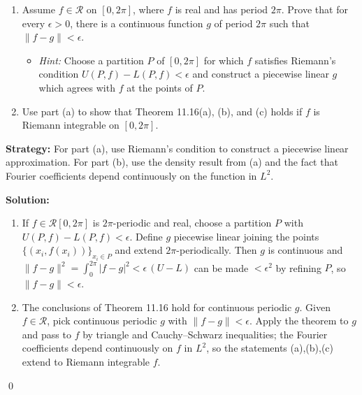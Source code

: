 \begin{problembox}
\begin{enumerate}[label=(\alph*)]
\item Assume $f \in \mathcal{R}$ on $[0, 2\pi]$, where $f$ is real and has period $2\pi$. Prove that for every $\epsilon > 0$, there is a continuous function $g$ of period $2\pi$ such that $\|f - g\| < \epsilon$.
\begin{itemize}
\item \textit{Hint:} Choose a partition $P$ of $[0, 2\pi]$ for which $f$ satisfies Riemann's condition $U(P, f) - L(P, f) < \epsilon$ and construct a piecewise linear $g$ which agrees with $f$ at the points of $P$.
\end{itemize}
\item Use part (a) to show that Theorem 11.16(a), (b), and (c) holds if $f$ is Riemann integrable on $[0, 2\pi]$.
\end{enumerate}
\end{problembox}

\noindent\textbf{Strategy:} For part (a), use Riemann's condition to construct a piecewise linear approximation. For part (b), use the density result from (a) and the fact that Fourier coefficients depend continuously on the function in $L^2$.

\bigskip\noindent\textbf{Solution:}
\begin{enumerate}[label=(\alph*)]
\item If $f\in\mathcal R[0,2\pi]$ is $2\pi$-periodic and real, choose a partition $P$ with $U(P,f)-L(P,f)<\epsilon$. Define $g$ piecewise linear joining the points $\{(x_i,f(x_i))\}_{x_i\in P}$ and extend $2\pi$-periodically. Then $g$ is continuous and $\|f-g\|^2=\int_0^{2\pi}|f-g|^2<\epsilon\,(U-L)$ can be made $<\epsilon^2$ by refining $P$, so $\|f-g\|<\epsilon$.
\item The conclusions of Theorem 11.16 hold for continuous periodic $g$. Given $f\in\mathcal R$, pick continuous periodic $g$ with $\|f-g\|<\epsilon$. Apply the theorem to $g$ and pass to $f$ by triangle and Cauchy–Schwarz inequalities; the Fourier coefficients depend continuously on $f$ in $L^2$, so the statements (a),(b),(c) extend to Riemann integrable $f$.
\end{enumerate}\qed


